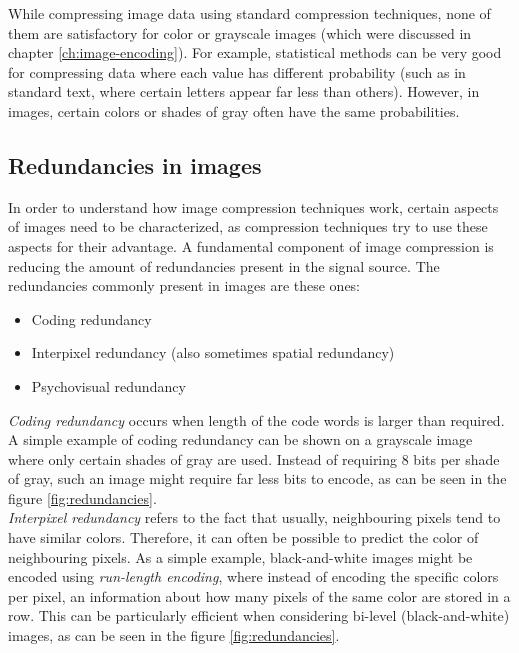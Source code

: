 \documentclass[thesis=M,english]{FITthesis}[2012/10/20]
\begin{document}
While compressing image data using standard compression techniques, none of them
are satisfactory for color or grayscale images (which were discussed in chapter
\ref{ch:image-encoding}). For example, statistical methods can be very good for
compressing data where each value has different probability (such as in standard
text, where certain letters appear far less than others). However, in images, certain
colors or shades of gray often have the same probabilities.\cite{datacompressioncompleteref}
\\


\subsection{Redundancies in images}
\label{sec:imgcmpr-redund}
In order to understand how image compression techniques work, certain aspects of
images need to be characterized, as compression techniques try to use these
aspects for their advantage. A fundamental component of image compression is
reducing the amount of redundancies present in the signal source. The redundancies
commonly present in images are these ones:

\begin{itemize}
  \item Coding redundancy
  \item Interpixel redundancy (also sometimes spatial redundancy)
  \item Psychovisual redundancy
\end{itemize}
\cite{fromdcttowavelet}

\emph{Coding redundancy} occurs when length of the code words is larger than
required. A simple example of coding redundancy can be shown on a grayscale
image where only certain shades of gray are used. Instead of requiring
8 bits per shade of gray, such an image might require far less bits to
encode, as can be seen in the figure \ref{fig:redundancies}.
\\

\emph{Interpixel redundancy} refers to the fact that usually, neighbouring pixels
tend to have similar colors. Therefore, it can often be possible to predict
the color of neighbouring pixels. As a simple example, black-and-white images
might be encoded using \emph{run-length encoding}, where instead of 
encoding the specific colors per pixel, an information about how many
pixels of the same color are stored in a row. This can be particularly
efficient when considering bi-level (black-and-white) images, as can be seen
in the figure \ref{fig:redundancies}.
\\
\end{document}
